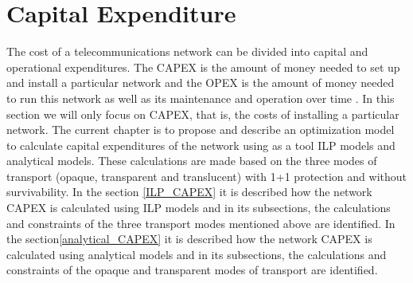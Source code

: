 
\chapter{Capital Expenditure}
\label{chap_capex}
The cost of a telecommunications network can be divided into capital and operational expenditures. The CAPEX is the amount of money needed to set up and install a particular network and the OPEX is the amount of money needed to run this network as well as its maintenance and operation over time \cite{capex}\cite{opex}\cite{aulas}. In this section we will only focus on CAPEX, that is, the costs of installing a particular network.
The current chapter is to propose and describe an optimization model to calculate capital expenditures of the network using as a tool ILP models and analytical models. These calculations are made based on the three modes of transport (opaque, transparent and translucent) with 1+1 protection and without survivability.
In the section \ref{ILP_CAPEX} it is described how the network CAPEX is calculated using ILP models and in its subsections, the calculations and constraints of the three transport modes mentioned above are identified.
In the section\ref{analytical_CAPEX} it is described how the network CAPEX is calculated using analytical models and in its subsections, the calculations and constraints of the opaque and transparent modes of transport are identified.










